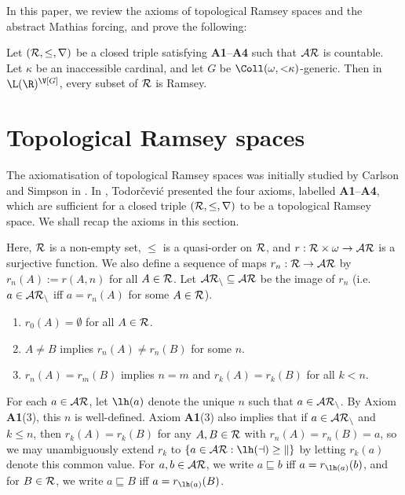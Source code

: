 \documentclass[11pt,reqno]{amsart}
\begin{document}
In this paper, we review the axioms of topological Ramsey spaces and the abstract Mathias forcing, and prove the following:

\begin{theorem}
\label{thm:main}
    Let $(\cal{R},\leq,r)$ be a closed triple satisfying \textbf{A1}--\textbf{A4} such that $\cal{AR}$ is countable. Let $\kappa$ be an inaccessible cardinal, and let $G$ be $\Coll(\omega,{<}\kappa)$-generic. Then in $\L(\R)^{\V[G]}$, every subset of $\cal{R}$ is Ramsey.
\end{theorem}

\section{Topological Ramsey spaces}
\label{sec:TRS}
The axiomatisation of topological Ramsey spaces was initially studied by Carlson and Simpson in \cite{CS90}. In \cite{T10}, Todor\v{c}evi\'{c} presented the four axioms, labelled \textbf{A1}--\textbf{A4}, which are sufficient for a closed triple $(\cal{R},\leq,r)$ to be a topological Ramsey space. We shall recap the axioms in this section.

Here, $\cal{R}$ is a non-empty set, $\leq$ is a quasi-order on $\cal{R}$, and $r : \cal{R} \times \omega \to \cal{AR}$ is a surjective function. We also define a sequence of maps $r_n : \cal{R} \to \cal{AR}$ by $r_n(A) := r(A,n)$ for all $A \in \cal{R}$. Let $\cal{AR}_n \subseteq \cal{AR}$ be the image of $r_n$ (i.e. $a \in \cal{AR}_n$ iff $a = r_n(A)$ for some $A \in \cal{R}$).

\begin{axiom}
\hfill
    \begin{enumerate}[label=(\arabic*)]
        \item $r_0(A) = \emptyset$ for all $A \in \cal{R}$.

        \item $A \neq B$ implies $r_n(A) \neq r_n(B)$ for some $n$.

        \item $r_n(A) = r_m(B)$ implies $n = m$ and $r_k(A) = r_k(B)$ for all $k < n$.
    \end{enumerate}
\end{axiom}

For each $a \in \cal{AR}$, let $\lh(a)$ denote the unique $n$ such that $a \in \cal{AR}_n$. By Axiom \textbf{A1}(3), this $n$ is well-defined. Axiom \textbf{A1}(3) also implies that if $a \in \cal{AR}_n$ and $k \leq n$, then $r_k(A) = r_k(B)$ for any $A,B \in \cal{R}$ with $r_n(A) = r_n(B) = a$, so we may unambiguously extend $r_k$ to $\{a \in \cal{AR} : \lh(a) \geq k\}$ by letting $r_k(a)$ denote this common value. For $a,b \in \cal{AR}$, we write $a \sqsubseteq b$ iff $a = r_{\lh(a)}(b)$, and for $B \in \cal{R}$, we write $a \sqsubseteq B$ iff $a = r_{\lh(a)}(B)$.
\end{document}
